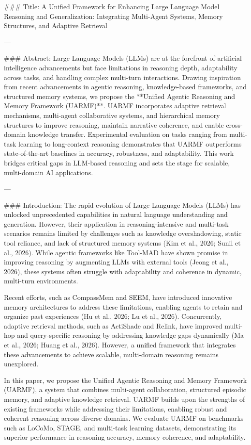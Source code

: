 ### Title:
A Unified Framework for Enhancing Large Language Model Reasoning and Generalization: Integrating Multi-Agent Systems, Memory Structures, and Adaptive Retrieval

---

### Abstract:
Large Language Models (LLMs) are at the forefront of artificial intelligence advancements but face limitations in reasoning depth, adaptability across tasks, and handling complex multi-turn interactions. Drawing inspiration from recent advancements in agentic reasoning, knowledge-based frameworks, and structured memory systems, we propose the **Unified Agentic Reasoning and Memory Framework (UARMF)**. UARMF incorporates adaptive retrieval mechanisms, multi-agent collaborative systems, and hierarchical memory structures to improve reasoning, maintain narrative coherence, and enable cross-domain knowledge transfer. Experimental evaluation on tasks ranging from multi-task learning to long-context reasoning demonstrates that UARMF outperforms state-of-the-art baselines in accuracy, robustness, and adaptability. This work bridges critical gaps in LLM-based reasoning and sets the stage for scalable, multi-domain AI applications.

---

### Introduction:
The rapid evolution of Large Language Models (LLMs) has unlocked unprecedented capabilities in natural language understanding and generation. However, their application in reasoning-intensive and multi-task scenarios remains limited by challenges such as knowledge overshadowing, static tool reliance, and lack of structured memory systems (Kim et al., 2026; Sunil et al., 2026). While agentic frameworks like Tool-MAD have shown promise in improving reasoning by augmenting LLMs with external tools (Jeong et al., 2026), these systems often struggle with adaptability and coherence in dynamic, multi-turn environments.

Recent efforts, such as CompassMem and SEEM, have introduced innovative memory architectures to address these limitations, enabling agents to retain and organize past experiences (Hu et al., 2026; Lu et al., 2026). Concurrently, adaptive retrieval methods, such as ActiShade and Relink, have improved multi-hop and query-specific reasoning by addressing knowledge gaps dynamically (Ma et al., 2026; Huang et al., 2026). However, a unified framework that integrates these advancements to achieve scalable, multi-domain reasoning remains unexplored.

In this paper, we propose the Unified Agentic Reasoning and Memory Framework (UARMF), a system that combines multi-agent collaboration, structured episodic memory, and adaptive knowledge retrieval. UARMF builds upon the strengths of existing frameworks while addressing their limitations, enabling robust and coherent reasoning across diverse domains. We evaluate UARMF on benchmarks such as LoCoMo, STAGE, and multi-task learning datasets, demonstrating its superior performance in reasoning accuracy, memory coherence, and adaptability.

